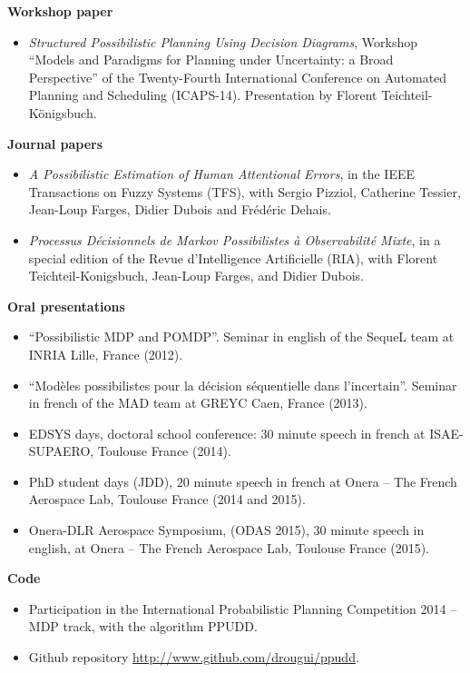 \textbf{Workshop paper}
\begin{itemize}
\item \textit{Structured Possibilistic Planning Using Decision Diagrams}, 
Workshop ``Models and Paradigms for Planning under Uncertainty: a Broad Perspective'' 
of the Twenty-Fourth International Conference on Automated Planning and Scheduling (ICAPS-14).
Presentation by Florent Teichteil-K\"onigsbuch.
\end{itemize}

\textbf{Journal papers}
\begin{itemize}
\item \textit{A Possibilistic Estimation of Human Attentional Errors},
in the IEEE Transactions on Fuzzy Systems (TFS),
with Sergio Pizziol, Catherine Tessier, Jean-Loup Farges, Didier Dubois and Fr\'ed\'eric Dehais.
\item \textit{Processus D\'ecisionnels de Markov Possibilistes \`a Observabilit\'e Mixte},
in a special edition of the Revue d'Intelligence Artificielle (RIA),
with Florent Teichteil-Konigsbuch, Jean-Loup Farges, and Didier Dubois.
\end{itemize}

\textbf{Oral presentations}
\begin{itemize}
\item ``Possibilistic MDP and POMDP''. Seminar in english of the SequeL team at INRIA Lille, France (2012). 
\item ``Mod\`eles possibilistes pour la d\'ecision s\'equentielle dans l'incertain''. Seminar in french of the MAD team at GREYC Caen, France (2013).
\item EDSYS days, doctoral school conference: $30$ minute speech in french at ISAE-SUPAERO, Toulouse France (2014). 
\item PhD student days (JDD), $20$ minute speech in french at Onera -- The French Aerospace Lab, Toulouse France (2014 and 2015).
\item Onera-DLR Aerospace Symposium, (ODAS 2015), $30$ minute speech in english, at Onera -- The French Aerospace Lab, Toulouse France (2015).
\end{itemize}

\textbf{Code}
\begin{itemize}
\item Participation in the International Probabilistic Planning Competition 2014 -- MDP track, with the algorithm PPUDD.
\item Github repository \url{http://www.github.com/drougui/ppudd}.
\end{itemize}
